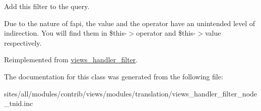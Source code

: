 Add this filter to the query.

Due to the nature of fapi, the value and the operator have an unintended level of indirection. You will find them in \$this-$>$operator and \$this-$>$value respectively. 

Reimplemented from \hyperlink{classviews__handler__filter_8e513b3abbc2559f37b550ca4957b4ae}{views\_\-handler\_\-filter}.

The documentation for this class was generated from the following file:\begin{CompactItemize}
\item 
sites/all/modules/contrib/views/modules/translation/views\_\-handler\_\-filter\_\-node\_\-tnid.inc\end{CompactItemize}
